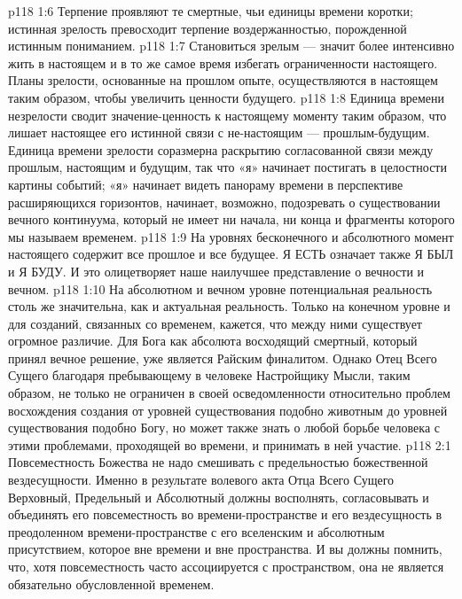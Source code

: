 \vs p118 1:6 \pc Терпение проявляют те смертные, чьи единицы времени коротки; истинная зрелость превосходит терпение воздержанностью, порожденной истинным пониманием.
\vs p118 1:7 \pc Становиться зрелым --- значит более интенсивно жить в настоящем и в то же самое время избегать ограниченности настоящего. Планы зрелости, основанные на прошлом опыте, осуществляются в настоящем таким образом, чтобы увеличить ценности будущего.
\vs p118 1:8 Единица времени незрелости сводит значение\hyp{}ценность к настоящему моменту таким образом, что лишает настоящее его истинной связи с не\hyp{}настоящим --- прошлым\hyp{}будущим. Единица времени зрелости соразмерна раскрытию согласованной связи между прошлым, настоящим и будущим, так что «я» начинает постигать в целостности картины событий; «я» начинает видеть панораму времени в перспективе расширяющихся горизонтов, начинает, возможно, подозревать о существовании вечного континуума, который не имеет ни начала, ни конца и фрагменты которого мы называем временем.
\vs p118 1:9 На уровнях бесконечного и абсолютного момент настоящего содержит все прошлое и все будущее. Я ЕСТЬ означает также Я БЫЛ и Я БУДУ. И это олицетворяет наше наилучшее представление о вечности и вечном.
\vs p118 1:10 На абсолютном и вечном уровне потенциальная реальность столь же значительна, как и актуальная реальность. Только на конечном уровне и для созданий, связанных со временем, кажется, что между ними существует огромное различие. Для Бога как абсолюта восходящий смертный, который принял вечное решение, уже является Райским финалитом. Однако Отец Всего Сущего благодаря пребывающему в человеке Настройщику Мысли, таким образом, не только не ограничен в своей осведомленности относительно проблем восхождения создания от уровней существования подобно животным до уровней существования подобно Богу, но может также знать о любой борьбе человека с этими проблемами, проходящей во времени, и принимать в ней участие.
\vs p118 2:1 Повсеместность Божества не надо смешивать с предельностью божественной вездесущности. Именно в результате волевого акта Отца Всего Сущего Верховный, Предельный и Абсолютный должны восполнять, согласовывать и объединять его повсеместность во времени\hyp{}пространстве и его вездесущность в преодоленном времени\hyp{}пространстве с его вселенским и абсолютным присутствием, которое вне времени и вне пространства. И вы должны помнить, что, хотя повсеместность часто ассоциируется с пространством, она не является обязательно обусловленной временем.
